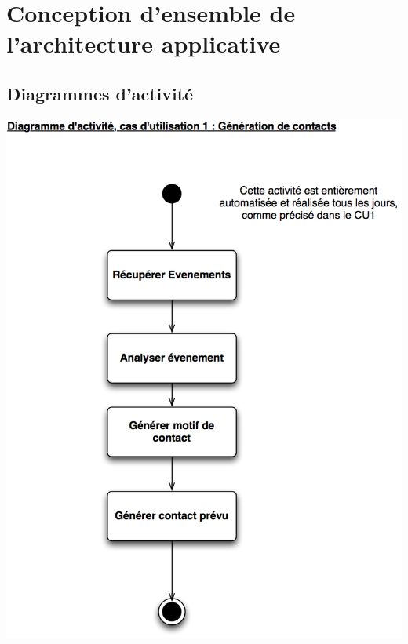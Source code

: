 
\section{Conception d'ensemble de l'architecture applicative}

\subsection{Diagrammes d'activité}

\begin {center}
\includegraphics{../../diagrammeActivite/DACU1.png}

\end{center}
